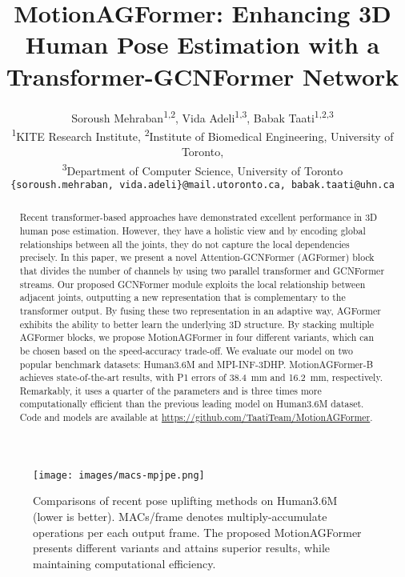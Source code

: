\documentclass[10pt,twocolumn,letterpaper]{article}
\begin{document}
\title{MotionAGFormer: Enhancing 3D Human Pose Estimation with a Transformer-GCNFormer Network}

\author{Soroush Mehraban\textsuperscript{1,2}, Vida Adeli\textsuperscript{1,3}, Babak Taati\textsuperscript{1,2,3}\\
\textsuperscript{1}KITE Research Institute,
\textsuperscript{2}Institute of Biomedical Engineering, University of Toronto,\\
\textsuperscript{3}Department of Computer Science, University of Toronto\\
{\tt\small \{soroush.mehraban, vida.adeli\}@mail.utoronto.ca, babak.taati@uhn.ca}
}
\maketitle

\begin{abstract}
    Recent transformer-based approaches have demonstrated excellent performance in 3D human pose estimation. However, they have a holistic view and by encoding global relationships between all the joints, they do not capture the local dependencies precisely. In this paper, we present a novel Attention-GCNFormer (AGFormer) block that divides the number of channels by using two parallel transformer and GCNFormer streams. Our proposed GCNFormer module exploits the local relationship between adjacent joints, outputting a new representation that is complementary to the transformer output. By fusing these two representation in an adaptive way, AGFormer exhibits the ability to better learn the underlying 3D structure. By stacking multiple AGFormer blocks, we propose MotionAGFormer in four different variants, which can be chosen based on the speed-accuracy trade-off. We evaluate our model on two popular benchmark datasets: Human3.6M and MPI-INF-3DHP. MotionAGFormer-B achieves state-of-the-art results, with P1 errors of 38.4~mm and 16.2~mm, respectively. Remarkably, it uses a quarter of the parameters and is three times more computationally efficient than the previous leading model on Human3.6M dataset. Code and models are available at \url{https://github.com/TaatiTeam/MotionAGFormer}.
\end{abstract}

\begin{figure}[!t]
    \centering
    \texttt{[image: images/macs-mpjpe.png]}
    \caption{Comparisons of recent pose uplifting methods on Human3.6M~\cite{ionescu2013human3} (lower is better). MACs/frame denotes multiply-accumulate operations per each output frame. The proposed MotionAGFormer presents different variants and attains superior results, while maintaining computational efficiency.}
    \label{fig:macs-mpjpe}
\end{figure}
\end{document}
